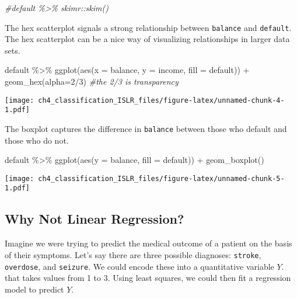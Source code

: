 \documentclass[
]{article}
\newenvironment{Shaded}{\begin{snugshade}}{\end{snugshade}}
\newcommand{\AttributeTok}[1]{\textcolor[rgb]{0.77,0.63,0.00}{#1}}
\newcommand{\CommentTok}[1]{\textcolor[rgb]{0.56,0.35,0.01}{\textit{#1}}}
\newcommand{\DecValTok}[1]{\textcolor[rgb]{0.00,0.00,0.81}{#1}}
\newcommand{\FunctionTok}[1]{\textcolor[rgb]{0.00,0.00,0.00}{#1}}
\newcommand{\NormalTok}[1]{#1}
\newcommand{\SpecialCharTok}[1]{\textcolor[rgb]{0.00,0.00,0.00}{#1}}
\begin{document}
\begin{Shaded}
\begin{Highlighting}[]
\CommentTok{\#default \%\textgreater{}\% skimr::skim()}
\end{Highlighting}
\end{Shaded}

The hex scatterplot signals a strong relationship between
\texttt{balance} and \texttt{default}. The hex scatterplot can be a nice
way of visualizing relationships in larger data sets.

\begin{Shaded}
\begin{Highlighting}[]
\NormalTok{default }\SpecialCharTok{\%\textgreater{}\%}
  \FunctionTok{ggplot}\NormalTok{(}\FunctionTok{aes}\NormalTok{(}\AttributeTok{x =}\NormalTok{ balance, }\AttributeTok{y =}\NormalTok{ income, }\AttributeTok{fill =}\NormalTok{ default)) }\SpecialCharTok{+} 
  \FunctionTok{geom\_hex}\NormalTok{(}\AttributeTok{alpha=}\DecValTok{2}\SpecialCharTok{/}\DecValTok{3}\NormalTok{) }\CommentTok{\#the 2/3 is transparency}
\end{Highlighting}
\end{Shaded}

\texttt{[image: ch4\_classification\_ISLR\_files/figure-latex/unnamed-chunk-4-1.pdf]}

The boxplot captures the difference in \texttt{balance} between those
who default and those who do not.

\begin{Shaded}
\begin{Highlighting}[]
\NormalTok{default }\SpecialCharTok{\%\textgreater{}\%}
  \FunctionTok{ggplot}\NormalTok{(}\FunctionTok{aes}\NormalTok{(}\AttributeTok{y =}\NormalTok{ balance, }\AttributeTok{fill =}\NormalTok{ default)) }\SpecialCharTok{+}
  \FunctionTok{geom\_boxplot}\NormalTok{()}
\end{Highlighting}
\end{Shaded}

\texttt{[image: ch4\_classification\_ISLR\_files/figure-latex/unnamed-chunk-5-1.pdf]}

\hypertarget{why-not-linear-regression}{%
\subsection{Why Not Linear
Regression?}\label{why-not-linear-regression}}

Imagine we were trying to predict the medical outcome of a patient on
the basis of their symptoms. Let's say there are three possible
diagnoses: \texttt{stroke}, \texttt{overdose}, and \texttt{seizure}. We
could encode these into a quantitative variable \(Y\). that takes values
from 1 to 3. Using least squares, we could then fit a regression model
to predict \(Y\).
\end{document}

